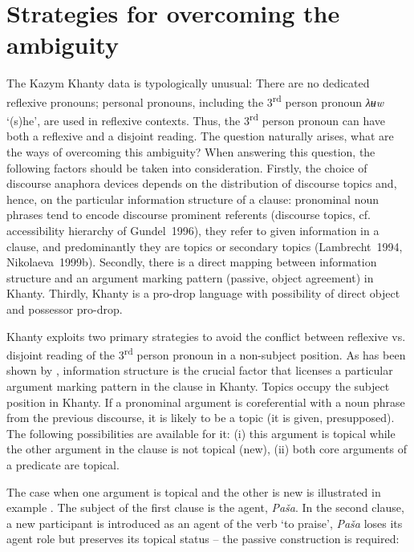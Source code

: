 \documentclass[output=paper]{langscibook}
\begin{document}
\section{{Strategies} {for} {overcoming} {the} {ambiguity}}\label{sec:Volkova:8}

The Kazym Khanty data is typologically unusual: There are no dedicated reflexive pronouns; personal pronouns, including the 3\textsuperscript{rd} person pronoun \textit{λʉw} ‘(s)he’, are used in reflexive contexts. Thus, the 3\textsuperscript{rd} person pronoun can have both a reflexive and a disjoint reading. The question naturally arises, what are the ways of overcoming this ambiguity? When answering this question, the following factors should be taken into consideration. Firstly, the choice of discourse anaphora devices depends on the distribution of discourse topics and, hence, on the particular information structure of a clause: pronominal noun phrases tend to encode discourse prominent referents (discourse topics, cf. accessibility hierarchy of Gundel~1996), they refer to given information in a clause, and predominantly they are topics or secondary topics (Lambrecht~1994, Nikolaeva~1999b). Secondly, there is a direct mapping between information structure and an %
argument marking pattern (passive, object agreement) in Khanty. Thirdly, Khanty is a pro-drop language with possibility of direct object and possessor pro-drop. 

Khanty exploits two primary strategies to avoid the conflict between reflexive vs. disjoint reading of the 3\textsuperscript{rd} person pronoun in a non-subject position. As has been shown by \citet{Nikolaeva1999Ostyak, Nikolaeva1999Agreement, ColleyPrivoznov2019, Kiss2019}, information structure is the crucial factor that licenses a particular argument marking pattern in the clause in Khanty. Topics occupy the subject position in Khanty. If a pronominal argument is coreferential with a noun phrase from the previous discourse, it is likely to be a topic (it is given, presupposed). The following possibilities are available for it: (i) this argument is topical while the other argument in the clause is not topical (new), (ii) both core arguments of a predicate are topical.

The case when one argument is topical and the other is new is illustrated in example . The subject of the first clause is the agent, \textit{Paša}. In the second clause, a new participant is introduced as an agent of the verb ‘to praise’, \textit{Paša} loses its agent role but preserves its topical status – the passive construction is required: 
\end{document}
